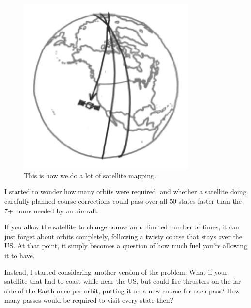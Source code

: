 {\begin{figure}[!htbp]
\centering
\includegraphics[scale=0.5, max width=0.8\textwidth]{imgs/a/113/polar.png}
\caption{This is how we do a lot of satellite mapping.}
\end{figure}

{I started to wonder how many orbits were required, and whether a satellite doing carefully planned course corrections could pass over all 50 states faster than the 7+ hours needed by an aircraft.}

{If you allow the satellite to change course an unlimited number of times, it can just forget about orbits completely, following a twisty course that stays over the US. At that point, it simply becomes a question of how much fuel you're allowing it to have.}

{Instead, I started considering another version of the problem: What if your satellite that had to coast while near the US, but could fire thrusters on the far side of the Earth once per orbit, putting it on a new course for each pass? How many passes would be required to visit every state then?}

}
